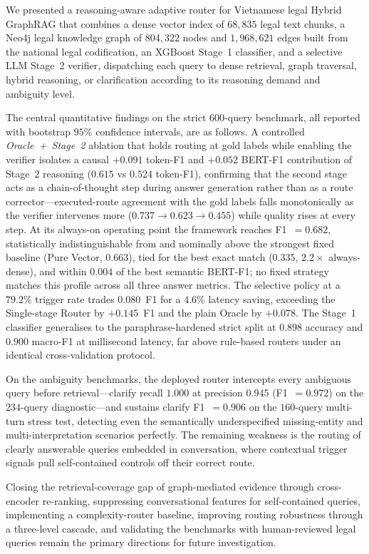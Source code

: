 \documentclass[pdflatex,sn-mathphys-num]{sn-jnl}
\begin{document}
We presented a reasoning-aware adaptive router for Vietnamese legal Hybrid
GraphRAG that combines a dense vector index of $68{,}835$ legal text chunks, a
Neo4j legal knowledge graph of $804{,}322$ nodes and $1{,}968{,}621$ edges
built from the national legal codification, an XGBoost Stage~1 classifier, and
a selective LLM Stage~2 verifier, dispatching each query to dense retrieval,
graph traversal, hybrid reasoning, or clarification according to its reasoning
demand and ambiguity level.

The central quantitative findings on the strict $600$-query benchmark, all
reported with bootstrap $95\%$ confidence intervals, are as follows. A
controlled \textit{Oracle~+~Stage~2} ablation that holds routing at gold
labels while enabling the verifier isolates a causal $+0.091$ token-F1 and
$+0.052$ BERT-F1 contribution of Stage~2 reasoning ($0.615$ vs $0.524$
token-F1), confirming that the second stage acts as a chain-of-thought step
during answer generation rather than as a route corrector---executed-route
agreement with the gold labels falls monotonically as the verifier
intervenes more ($0.737\!\to\!0.623\!\to\!0.455$) while quality rises at
every step. At its always-on operating point the framework reaches
F1~$=0.682$, statistically indistinguishable from and nominally above the
strongest fixed baseline (Pure Vector, $0.663$), tied for the best exact
match ($0.335$, $2.2\times$ always-dense), and within $0.004$ of the best
semantic BERT-F1; no fixed strategy matches this profile across all three
answer metrics. The selective policy at a $79.2\%$ trigger rate trades
$0.080$~F1 for a $4.6\%$ latency saving, exceeding the Single-stage Router
by $+0.145$~F1 and the plain Oracle by $+0.078$. The Stage~1 classifier
generalises to the paraphrase-hardened strict split at $0.898$ accuracy and
$0.900$ macro-F1 at millisecond latency, far above rule-based routers under
an identical cross-validation protocol.

On the ambiguity benchmarks, the deployed router intercepts every ambiguous
query before retrieval---clarify recall $1.000$ at precision $0.945$
(F1~$=0.972$) on the $234$-query diagnostic---and sustains clarify
F1~$=0.906$ on the $160$-query multi-turn stress test, detecting even the
semantically underspecified missing-entity and multi-interpretation scenarios
perfectly. The remaining weakness is the routing of clearly answerable
queries embedded in conversation, where contextual trigger signals pull
self-contained controls off their correct route.

Closing the retrieval-coverage gap of graph-mediated evidence through
cross-encoder re-ranking, suppressing conversational features for
self-contained queries, implementing a complexity-router baseline, improving
routing robustness through a three-level cascade, and validating the
benchmarks with human-reviewed legal queries remain the primary directions
for future investigation.
\end{document}
